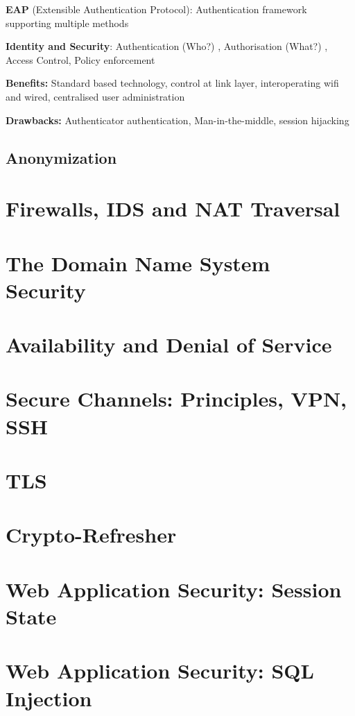 \documentclass[fs, footer]{latex4ei}
\begin{document}
\begin{multicols*}{4}
\textbf{EAP} (Extensible Authentication Protocol): Authentication framework supporting multiple methods

\textbf{Identity and Security}: Authentication (Who?) , Authorisation (What?) , Access Control, Policy enforcement

\textbf{Benefits:} Standard based technology, control at link layer, interoperating wifi and wired, centralised user administration

\textbf{Drawbacks:} Authenticator authentication, Man-in-the-middle, session hijacking


\subsection{Anonymization}

\section{Firewalls, IDS and NAT Traversal}

\section{The Domain Name System Security}

\section{Availability and Denial of Service}
\section{Secure Channels: Principles, VPN, SSH}

\section{TLS}

\section{Crypto-Refresher}

\section{Web Application Security: Session State}
\section{Web Application Security: SQL Injection}

\end{multicols*}
\end{document}
